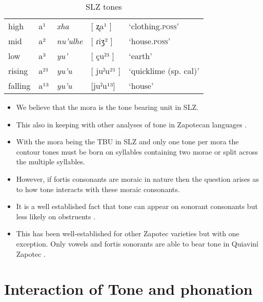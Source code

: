\documentclass[12pt, letterpaper]{article}
\providecommand{\lsptoprule}{\midrule\toprule}
\providecommand{\lspbottomrule}{\bottomrule\midrule}
\begin{document}
\begin{table}[!h]
\centering
\caption{SLZ tones}
\label{tab:tones}
 \begin{tabular}{lllll}
  \lsptoprule
  high   	&  a¹  &  \textit{xha}   &  [ ʐa¹ ] & `clothing.\textsc{poss}'\\
	mid    	&  a²  &  \textit{nu'ulhe} 	& [ ɾiʒ² ] & `house.\textsc{poss}' \\
	low   	&  a³  &  \textit{yu'} 	&	 [ çuˀ³ ] & `earth'\\
	rising	&  a²¹  &  \textit{yu'u} 	&	[ juˀu²¹ ] & `quicklime (sp. cal)' \\
	falling &  a¹³  &  \textit{yu'u}  &	[juˀu¹³] &	`house' \\
  \lspbottomrule
 \end{tabular}
\end{table}

\begin{itemize}
	\item We believe that the mora is the tone bearing unit in SLZ. 
	\item This also in keeping with other analyses of tone in Zapotecan languages \citep[e.g.,][]{chavez-peonInteractionMetricalStructure2010}.
	\item With the mora being the TBU in SLZ and only one tone per mora the contour tones must be born on syllables containing two morae or split across the multiple syllables. 
	\item However, if fortis consonants are moraic in nature then the question arises as to how tone interacts with these moraic consonants. 
	\item It is a well established fact that tone can appear on sonorant consonants but less likely on obstruents \citep[e.g.,][]{yipTone2002,hymanHowStudyTone2014,sniderEstablishingUnderlyingTonal2014,sniderToneAnalysisField2018}. 
	\item This has been well-established for other Zapotec varieties but with one exception. Only vowels and fortis sonorants are able to bear tone in Quiaviní Zapotec \citep[Ch. 5]{chavez-peonInteractionMetricalStructure2010}. 
\end{itemize}

\section{Interaction of Tone and phonation} \label{sec:Interaction}
\end{document}
